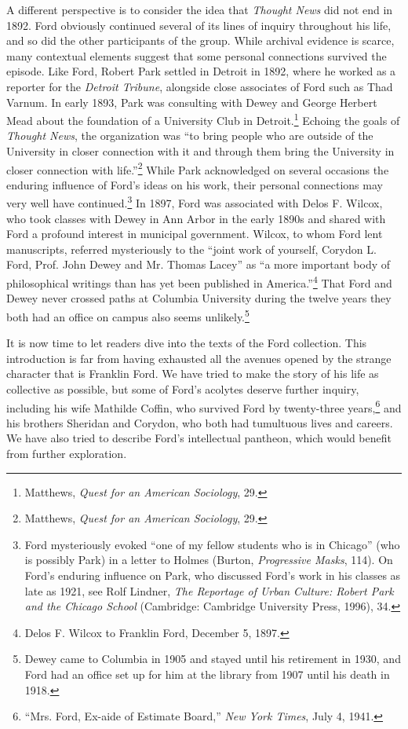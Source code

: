 \documentclass[openany,nobib]{tufte-book}
\begin{document}
A different perspective is to consider the idea that \emph{Thought News}
did not end in 1892. Ford obviously continued several of its lines of
inquiry throughout his life, and so did the other participants of the
group. While archival evidence is scarce, many contextual elements
suggest that some personal connections survived the episode. Like Ford,
Robert Park settled in Detroit in 1892, where he worked as a reporter
for the \emph{Detroit Tribune}, alongside close associates of Ford such
as Thad Varnum. In early 1893, Park was consulting with Dewey and George
Herbert Mead about the foundation of a University Club in
Detroit.\footnote{Matthews, \emph{Quest for an American Sociology}, 29.}
Echoing the goals of \emph{Thought News}, the organization was ``to
bring people who are outside of the University in closer connection with
it and through them bring the University in closer connection with
life.''\footnote{Matthews, \emph{Quest for an American Sociology}, 29.}
While Park acknowledged on several occasions the enduring influence of
Ford's ideas on his work, their personal connections may very well have
continued.\footnote{Ford mysteriously evoked ``one of my fellow students
  who is in Chicago'' (who is possibly Park) in a letter to Holmes
  (Burton, \emph{Progressive Masks}, 114). On Ford's enduring influence
  on Park, who discussed Ford's work in his classes as late as 1921, see
  Rolf Lindner, \emph{The Reportage of Urban Culture: Robert Park and
  the Chicago School} (Cambridge: Cambridge University Press, 1996), 34.}
In 1897, Ford was associated with Delos F. Wilcox, who took classes with
Dewey in Ann Arbor in the early 1890s and shared with Ford a profound
interest in municipal government. Wilcox, to whom Ford lent manuscripts,
referred mysteriously to the ``joint work of yourself, Corydon L. Ford,
Prof. John Dewey and Mr. Thomas Lacey'' as ``a more important body of
philosophical writings than has yet been published in
America.''\footnote{Delos F. Wilcox to Franklin Ford, December 5, 1897.}
That Ford and Dewey never crossed paths at Columbia University during
the twelve years they both had an office on campus also seems
unlikely.\footnote{Dewey came to Columbia in 1905 and stayed until his
  retirement in 1930, and Ford had an office set up for him at the
  library from 1907 until his death in 1918.}

It is now time to let readers dive into the texts of the Ford
collection. This introduction is far from having exhausted all the
avenues opened by the strange character that is Franklin Ford. We have
tried to make the story of his life as collective as possible, but some
of Ford's acolytes deserve further inquiry, including his wife Mathilde
Coffin, who survived Ford by twenty-three years,\footnote{``Mrs. Ford,
  Ex-aide of Estimate Board,'' \emph{New York Times}, July 4, 1941.} and
his brothers Sheridan and Corydon, who both had tumultuous lives and
careers. We have also tried to describe Ford's intellectual pantheon,
which would benefit from further exploration.
\end{document}
